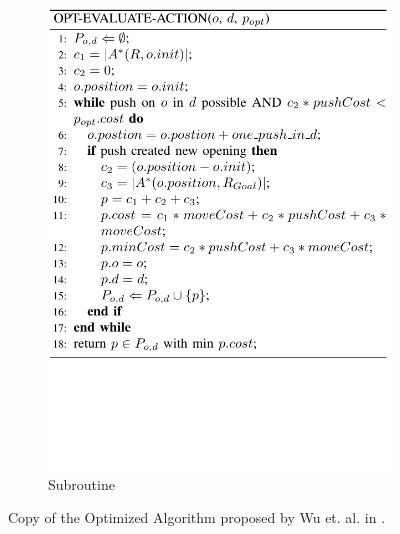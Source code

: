 \begin{figure}[H]
\begin{subfigure}{.45\textwidth}
  \centering
  \includegraphics[width=\linewidth]{Figures/Wu_Original_Algorithm/algo4.png}
  \caption{Subroutine}
  \label{fig:Wu_Original_Algorithm-algo4}
\end{subfigure}
\caption{Copy of the Optimized Algorithm proposed by Wu et. al. in \parencite{wu_navigation_2010}.}
\label{fig:Wu_Original_Algorithm-optimized}
\end{figure}

\clearpage

